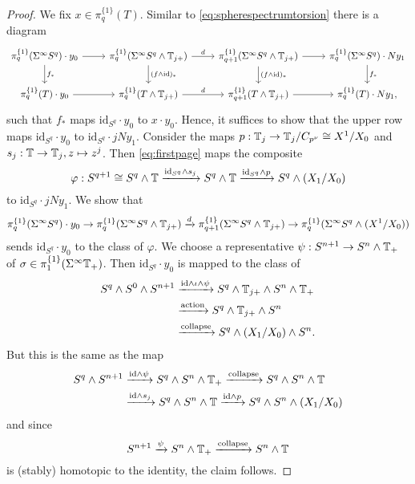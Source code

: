 \begin{proof}
We fix $x\in \pi_q^{\{1\}}(T)$. Similar to \eqref{eq:spherespectrumtorsion}
there is a diagram 
\[
\begin{tikzcd}
\pi_q^{\{1\}}(\Sigma^\infty S^q)\cdot y_0
\arrow{r}\arrow{d}{f_\ast}
&\pi_q^{\{1\}}(\Sigma^\infty S^q\wedge \TT_{j+})
\arrow{d}{(f\wedge \mathrm{id})_\ast}\arrow{r}{d}
&\pi_{q+1}^{\{1\}}(\Sigma^\infty S^q\wedge \TT_{j+})
\arrow{d}{(f\wedge \mathrm{id})_\ast}\arrow{r}
&\pi_q^{\{1\}}(\Sigma^\infty S^q)\cdot Ny_1
\arrow{d}{f_\ast}\\
\pi^{\{1\}}_q(T)\cdot y_0
\arrow{r}
&\pi^{\{1\}}_q(T\wedge\TT_{j+})
\arrow{r}{d}
&\pi^{\{1\}}_{q+1}(T\wedge\TT_{j+})
\arrow{r}
&\pi_q^{\{1\}}(T)\cdot Ny_1,
\end{tikzcd}
\]
such that $f_\ast$ maps $\mathrm{id}_{S^q}\cdot y_0$ to $x\cdot y_0$.
Hence, it suffices to show that the upper row maps 
$\mathrm{id}_{S^q}\cdot y_0$ to $ \mathrm{id}_{S^q}\cdot jNy_1$.
Consider the maps $p:\mathbb{T}_j\to \mathbb{T}_j/C_{p^\nu}\cong X^1/X_0$
and $s_j:\mathbb{T}\to \mathbb{T}_j, z\mapsto z^j$. Then \eqref{eq:firstpage} maps
the composite
\[
\varphi: S^{q+1}\cong S^q\wedge \mathbb{T}
\xrightarrow{\mathrm{id}_{S^q}\wedge s_j} S^q\wedge \mathbb{T}
\xrightarrow{\mathrm{id}_{S^q}\wedge p} S^q\wedge(X_1/X_0)
\]
to $ \mathrm{id}_{S^q}\cdot jNy_1$. We show that
\[
\pi_q^{\{1\}}(\Sigma^\infty S^q)\cdot y_0
\to
\pi_q^{\{1\}}(\Sigma^\infty S^q\wedge \mathbb{T}_{j+})
\xrightarrow{d}
\pi_{q+1}^{\{1\}}(\Sigma^\infty S^q\wedge \mathbb{T}_{j+})
\to
\pi_q^{\{1\}}(\Sigma^\infty S^q\wedge (X^1/X_0))
\]
sends  $\mathrm{id}_{S^q}\cdot y_0$ to the class of $\varphi$.
We choose a representative $\psi:S^{n+1}\to S^n\wedge \mathbb{T}_+$
of $\sigma\in \pi^{\{1\}}_1(\Sigma^\infty \mathbb{T}_+)$. Then  $\mathrm{id}_{S^q}\cdot y_0$ 
is mapped to the class of
\begin{align*}
S^q\wedge S^0\wedge S^{n+1}
&\xrightarrow{\mathrm{id}\wedge \iota\wedge \psi}
S^q\wedge \mathbb{T}_{j+}\wedge S^n\wedge \mathbb{T}_+\\
&\xrightarrow{\mathrm{action}}
S^q\wedge \mathbb{T}_{j+}\wedge S^n\\
&\xrightarrow{\mathrm{collapse}} 
S^q\wedge (X_1/X_0)\wedge S^n.
\end{align*}
But this is the same as the map
\begin{align*}
S^q\wedge S^{n+1}
&\xrightarrow{\mathrm{id}\wedge \psi}
S^q\wedge S^n\wedge \mathbb{T}_+
\xrightarrow{\mathrm{collapse}}
S^q\wedge S^n\wedge \mathbb{T}\\
&\xrightarrow{\mathrm{id}\wedge s_j}
S^q\wedge S^n\wedge \mathbb{T}
\xrightarrow{\mathrm{id}\wedge p}
S^q\wedge S^n\wedge (X_1/X_0)
\end{align*}
and since 
\[
S^{n+1}\xrightarrow{\psi} S^n\wedge \mathbb{T}_+\xrightarrow{\mathrm{collapse}}
S^n\wedge \mathbb{T}
\]
is (stably) homotopic to the identity, the claim follows.
\end{proof}
